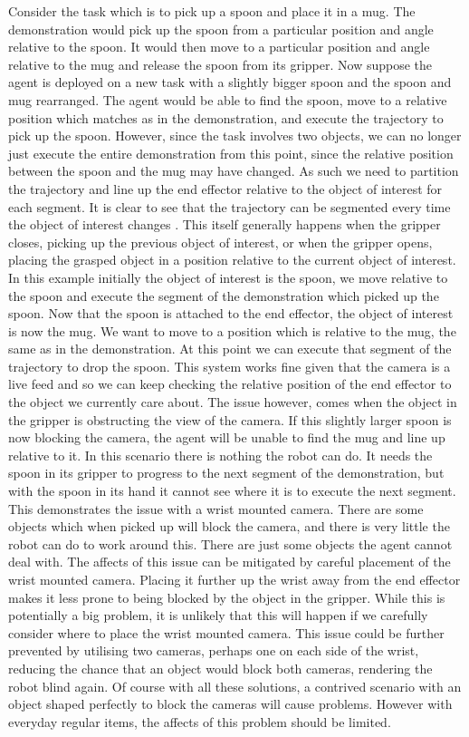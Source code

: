 Consider the task which is to pick up a spoon and place it in a mug. The demonstration would pick up the spoon from a particular position and angle relative to the spoon. It would then move to a particular position and angle relative to the mug and release the spoon from its gripper. Now suppose the agent is deployed on a new task with a slightly bigger spoon and the spoon and mug rearranged. The agent would be able to find the spoon, move to a relative position which matches as in the demonstration, and execute the trajectory to pick up the spoon. However, since the task involves two objects, we can no longer just execute the entire demonstration from this point, since the relative position between the spoon and the mug may have changed. As such we need to partition the trajectory and line up the end effector relative to the object of interest for each segment. It is clear to see that the trajectory can be segmented every time the object of interest changes \cite{mimicgen}. This itself generally happens when the gripper closes, picking up the previous object of interest, or when the gripper opens, placing the grasped object in a position relative to the current object of interest. In this example initially the object of interest is the spoon, we move relative to the spoon and execute the segment of the demonstration which picked up the spoon. Now that the spoon is attached to the end effector, the object of interest is now the mug. We want to move to a position which is relative to the mug, the same as in the demonstration. At this point we can execute that segment of the trajectory to drop the spoon. This system works fine given that the camera is a live feed and so we can keep checking the relative position of the end effector to the object we currently care about. The issue however, comes when the object in the gripper is obstructing the view of the camera. If this slightly larger spoon is now blocking the camera, the agent will be unable to find the mug and line up relative to it. In this scenario there is nothing the robot can do. It needs the spoon in its gripper to progress to the next segment of the demonstration, but with the spoon in its hand it cannot see where it is to execute the next segment. This demonstrates the issue with a wrist mounted camera. There are some objects which when picked up will block the camera, and there is very little the robot can do to work around this. There are just some objects the agent cannot deal with. The affects of this issue can be mitigated by careful placement of the wrist mounted camera. Placing it further up the wrist away from the end effector makes it less prone to being blocked by the object in the gripper. While this is potentially a big problem, it is unlikely that this will happen if we carefully consider where to place the wrist mounted camera. This issue could be further prevented by utilising two cameras, perhaps one on each side of the wrist, reducing the chance that an object would block both cameras, rendering the robot blind again. Of course with all these solutions, a contrived scenario with an object shaped perfectly to block the cameras will cause problems. However with everyday regular items, the affects of this problem should be limited.\\

